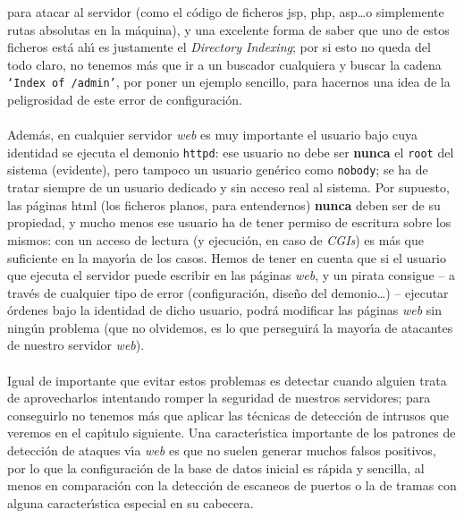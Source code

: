 para atacar al servidor (como el c\'odigo de ficheros {\sc jsp}, {\sc php}, {\sc
asp}\ldots o simplemente rutas absolutas en la m\'aquina), y una excelente
forma de saber que uno de estos ficheros est\'a ah\'{\i} es justamente el {\it
Directory Indexing}; por si esto no queda del todo claro, no tenemos m\'as que
ir a un buscador cualquiera y buscar la cadena {\tt `Index of /admin'}, por 
poner un ejemplo sencillo, para hacernos una idea de la peligrosidad de este 
error de configuraci\'on.\\
\\Adem\'as, en cualquier servidor {\it web} es muy importante el usuario bajo
cuya identidad se ejecuta el demonio {\tt httpd}: ese usuario no debe ser {\bf
nunca} el {\tt root} del sistema (evidente), pero tampoco un usuario gen\'erico
como {\tt nobody}; se ha de tratar siempre de un usuario dedicado y sin acceso
real al sistema. Por supuesto, las p\'aginas {\sc html} (los ficheros planos,
para entendernos) {\bf nunca} deben ser de su propiedad, y mucho menos ese 
usuario ha de tener permiso de escritura sobre los mismos: con un acceso de 
lectura (y ejecuci\'on, en caso de {\it CGIs}) es m\'as que suficiente en la
mayor\'{\i}a de los casos. Hemos de tener en cuenta que si el usuario que 
ejecuta el servidor puede escribir en las p\'aginas {\it web}, y un pirata
consigue -- a trav\'es de cualquier tipo de error (configuraci\'on, dise\~no del
demonio\ldots) -- ejecutar \'ordenes bajo la identidad de dicho usuario, podr\'a
modificar las p\'aginas {\it web} sin ning\'un problema (que no olvidemos, es
lo que perseguir\'a la mayor\'{\i}a de atacantes de nuestro servidor {\it 
web}).\\
\\Igual de importante que evitar estos problemas es detectar cuando alguien
trata de aprovecharlos intentando romper la seguridad de nuestros servidores; 
para conseguirlo no tenemos m\'as que aplicar las t\'ecnicas de detecci\'on de 
intrusos que veremos en el cap\'{\i}tulo siguiente. Una caracter\'{\i}stica
importante de los patrones de detecci\'on de ataques v\'{\i}a {\it web} es que
no suelen generar muchos falsos positivos, por lo que la configuraci\'on de la
base de datos inicial es r\'apida y sencilla, al menos en comparaci\'on con la
detecci\'on de escaneos de puertos o la de tramas con alguna caracter\'{\i}stica
especial en su cabecera.
